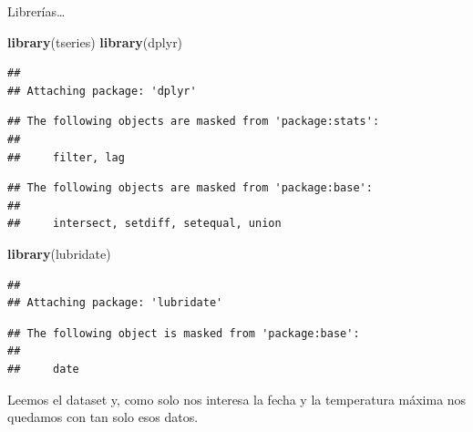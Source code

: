 \documentclass[]{article}
\newenvironment{Shaded}{\begin{snugshade}}{\end{snugshade}}
\newcommand{\KeywordTok}[1]{\textcolor[rgb]{0.13,0.29,0.53}{\textbf{#1}}}
\newcommand{\DataTypeTok}[1]{\textcolor[rgb]{0.13,0.29,0.53}{#1}}
\newcommand{\StringTok}[1]{\textcolor[rgb]{0.31,0.60,0.02}{#1}}
\newcommand{\OtherTok}[1]{\textcolor[rgb]{0.56,0.35,0.01}{#1}}
\newcommand{\OperatorTok}[1]{\textcolor[rgb]{0.81,0.36,0.00}{\textbf{#1}}}
\newcommand{\NormalTok}[1]{#1}
\begin{document}
Librerías\ldots{}

\begin{Shaded}
\begin{Highlighting}[]
\KeywordTok{library}\NormalTok{(tseries)}
\KeywordTok{library}\NormalTok{(dplyr)}
\end{Highlighting}
\end{Shaded}

\begin{verbatim}
## 
## Attaching package: 'dplyr'
\end{verbatim}

\begin{verbatim}
## The following objects are masked from 'package:stats':
## 
##     filter, lag
\end{verbatim}

\begin{verbatim}
## The following objects are masked from 'package:base':
## 
##     intersect, setdiff, setequal, union
\end{verbatim}

\begin{Shaded}
\begin{Highlighting}[]
\KeywordTok{library}\NormalTok{(lubridate)}
\end{Highlighting}
\end{Shaded}

\begin{verbatim}
## 
## Attaching package: 'lubridate'
\end{verbatim}

\begin{verbatim}
## The following object is masked from 'package:base':
## 
##     date
\end{verbatim}

Leemos el dataset y, como solo nos interesa la fecha y la temperatura
máxima nos quedamos con tan solo esos datos.

\begin{Shaded}
\end{Shaded}
\end{document}
